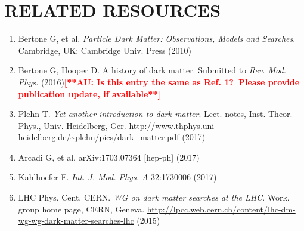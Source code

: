 \documentclass{ar-1col}
\begin{document}
\section*{RELATED RESOURCES}
\begin{enumerate}
\item Bertone G, et al. \textit{Particle Dark Matter: Observations, Models and Searches}. Cambridge, UK: Cambridge Univ. Press (2010)%

\item Bertone G, Hooper D. {A history of dark matter. Submitted to \textit{Rev. Mod. Phys.}} (2016)\textbf{\textcolor{red}{[**AU: Is this entry the same as Ref. 1?\ Please provide publication update, if available**]}}

\item Plehn T. \textit{Yet another introduction to dark matter}. Lect. notes, Inst. Theor. Phys., Univ. Heidelberg, Ger. \url{http://www.thphys.uni-heidelberg.de/~plehn/pics/dark_matter.pdf} (2017)

\item Arcadi G, et al. {arXiv:1703.07364 [hep-ph]} (2017)%

\item Kahlhoefer F. \textit{Int. J. Mod. Phys. A} 32:1730006 (2017)

\item {LHC Phys. Cent. CERN.\textit{ WG on dark matter searches at the LHC}. Work. group home page, CERN, Geneva.} \url{http://lpcc.web.cern.ch/content/lhc-dm-wg-wg-dark-matter-searches-lhc} (2015)

\end{enumerate}
\end{document}
